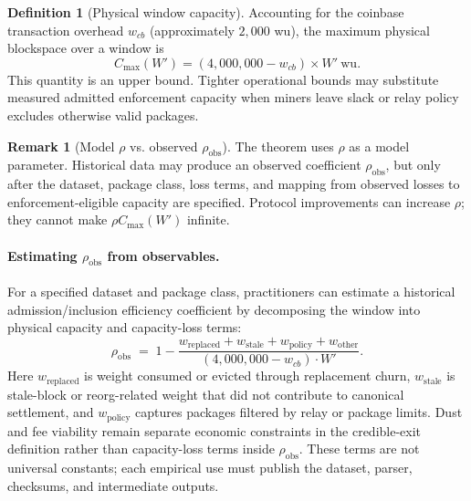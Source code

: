 \documentclass{article}
\theoremstyle{definition}
\newtheorem{definition}{Definition}
\newtheorem{remark}{Remark}
\begin{document}
\begin{definition}[Physical window capacity]
Accounting for the coinbase transaction overhead $w_{cb}$ (approximately $2{,}000$ wu), the maximum physical blockspace over a window is
\small
\begin{equation*}
C_{\max}(W') = (4{,}000{,}000 - w_{cb}) \times W'~\mathrm{wu}.
\end{equation*}
\normalsize
This quantity is an upper bound. Tighter operational bounds may substitute measured admitted enforcement capacity when miners leave slack or relay policy excludes otherwise valid packages.
\end{definition}

\begin{remark}[Model $\rho$ vs. observed $\rho_{\mathrm{obs}}$]
The theorem uses $\rho$ as a model parameter. Historical data may produce an observed coefficient $\rho_{\mathrm{obs}}$, but only after the dataset, package class, loss terms, and mapping from observed losses to enforcement-eligible capacity are specified. Protocol improvements can increase $\rho$; they cannot make $\rho C_{\max}(W')$ infinite.
\end{remark}

\paragraph{Estimating $\rho_{\mathrm{obs}}$ from observables.}
For a specified dataset and package class, practitioners can estimate a historical admission/inclusion efficiency coefficient by decomposing the window into physical capacity and capacity-loss terms:
\small
\begin{equation*}
\rho_{\mathrm{obs}} \;=\; 1 - \frac{w_{\mathrm{replaced}} + w_{\mathrm{stale}} + w_{\mathrm{policy}} + w_{\mathrm{other}}}{(4{,}000{,}000 - w_{cb}) \cdot W'}.
\end{equation*}
\normalsize
Here $w_{\mathrm{replaced}}$ is weight consumed or evicted through replacement churn, $w_{\mathrm{stale}}$ is stale-block or reorg-related weight that did not contribute to canonical settlement, and $w_{\mathrm{policy}}$ captures packages filtered by relay or package limits. Dust and fee viability remain separate economic constraints in the credible-exit definition rather than capacity-loss terms inside $\rho_{\mathrm{obs}}$. These terms are not universal constants; each empirical use must publish the dataset, parser, checksums, and intermediate outputs.
\end{document}
